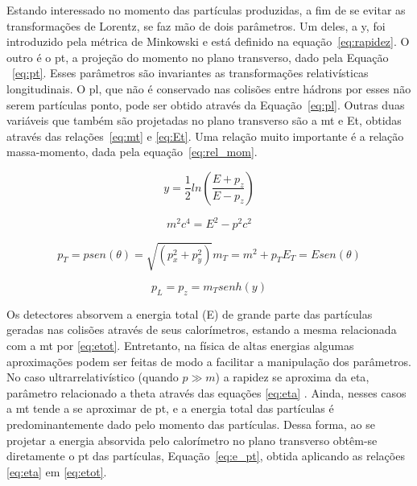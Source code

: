 Estando interessado no momento das partículas
produzidas, a fim de se evitar as transformações de Lorentz, se faz mão de dois
parâmetros. Um deles, a \gls{y}, foi introduzido pela métrica de Minkowski
\cite{schlippe} e está definido na equação~\ref{eq:rapidez}.
O outro é o \gls{pt}, a projeção do momento no plano
transverso, dado pela Equação ~\ref{eq:pt}. 
Esses parâmetros são invariantes as transformações relativísticas 
longitudinais. O \gls{pl}, que não é conservado nas colisões entre hádrons por
esses não serem partículas ponto, pode ser obtido através
da Equação~\ref{eq:pl}. Outras duas variáveis que também
são projetadas no plano transverso são a \gls{mt} e \gls{Et}, obtidas através das
relações~\ref{eq:mt} e \ref{eq:Et}. Uma relação muito importante é a relação
massa-momento, dada pela equação~\ref{eq:rel_mom}.

\begin{equation}\label{eq:rapidez}
y = \frac{1}{2}ln\left(\frac{E+p_z}{E-p_z}\right)
\end{equation}

\begin{equation}\label{eq:rel_mom}
m^2c^4 = E^2 - p^2c^2
\end{equation}

\begin{subequations}\label{eq:proj_transv}
\begin{equation}\label{eq:pt}
p_T = p sen ( \theta ) = \sqrt{(p_x^2 + p_y^2)}
\end{equation}
\begin{equation}\label{eq:mt}
m_T = m^2 + p_T
\end{equation}
\begin{equation}\label{eq:Et}
E_T = E sen ( \theta )
\end{equation}
\end{subequations}

\begin{equation}\label{eq:pl}
p_L = p_z = m_T senh ( y )
\end{equation}

Os detectores absorvem a energia total (E) de grande parte das partículas
geradas nas colisões através de seus calorímetros, 
estando a mesma relacionada com a \gls{mt} por \ref{eq:etot}. Entretanto, na física de 
altas energias algumas aproximações podem
ser feitas de modo a facilitar a manipulação dos parâmetros. No caso ultrarrelativístico (quando $p \gg
m$) a rapidez se aproxima da \gls{eta}, parâmetro relacionado a \gls{theta}
através das equações \ref{eq:eta} \cite{pdg_book}.
Ainda, nesses casos a \gls{mt} tende a se aproximar de
\gls{pt}, e a energia total das partículas é predominantemente dado
pelo momento das partículas. Dessa forma, ao se projetar a energia absorvida
pelo calorímetro no plano transverso obtêm-se diretamente o \gls{pt} das
partículas, Equação~\ref{eq:e_pt}, obtida aplicando as relações \ref{eq:eta} em \ref{eq:etot}.

